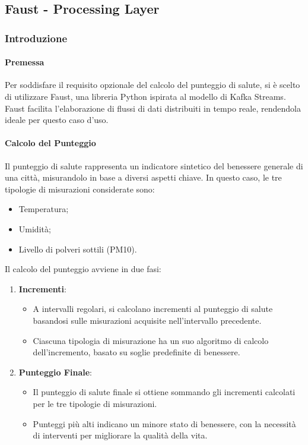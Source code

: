 \subsection{Faust - Processing Layer}
\subsubsection{Introduzione}
\paragraph*{Premessa}

Per soddisfare il requisito opzionale del calcolo del punteggio di salute, si è scelto di utilizzare Faust, una libreria Python ispirata al modello di Kafka Streams. Faust facilita l'elaborazione di flussi di dati distribuiti in tempo reale, rendendola ideale per questo caso d'uso.

\paragraph*{Calcolo del Punteggio}
Il punteggio di salute rappresenta un indicatore sintetico del benessere generale di una città, misurandolo in base a diversi aspetti chiave. In questo caso, le tre tipologie di misurazioni considerate sono:
\begin{itemize}
    \item Temperatura;
    \item Umidità;
    \item Livello di polveri sottili (PM10).
\end{itemize}

Il calcolo del punteggio avviene in due fasi:
\begin{enumerate}
    \item \textbf{Incrementi}: 
    \begin{itemize}
        \item A intervalli regolari, si calcolano incrementi al punteggio di salute basandosi sulle misurazioni acquisite nell'intervallo precedente.
        \item Ciascuna tipologia di misurazione ha un suo algoritmo di calcolo dell'incremento, basato su soglie predefinite di benessere.
    \end{itemize}
    \item \textbf{Punteggio Finale}:
    \begin{itemize}
        \item Il punteggio di salute finale si ottiene sommando gli incrementi calcolati per le tre tipologie di misurazioni.
        \item Punteggi più alti indicano un minore stato di benessere, con la necessità di interventi per migliorare la qualità della vita.
    \end{itemize}
\end{enumerate}


